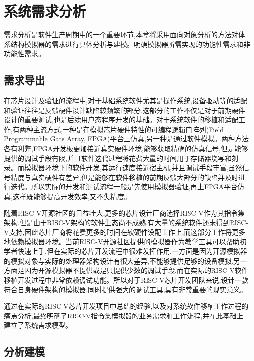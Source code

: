 
\chapter{系统需求分析}

需求分析是软件生产周期中的一个重要环节,本章将采用面向对象分析的方法对体系结构模拟器的需求进行具体分析与建模。明确模拟器所需实现的功能性需求和非功能性需求。

\section{需求导出}

在芯片设计及验证的流程中,对于基础系统软件尤其是操作系统,设备驱动等的适配和验证往往是反馈硬件设计缺陷较频繁的部分,这部分的工作不仅是对于前期硬件设计的重要测试,也是后续用户态程序开发的基础。对于系统软件的移植和适配工作,有两种主流方式,一种是在模拟芯片硬件特性的可编程逻辑门阵列(Field Programmable Gate Array, FPGA)平台上仿真,另一种是通过软件模拟。两种方法各有利弊,FPGA开发板更加接近真实硬件环境,能够获取精确的仿真信号,但是能够提供的调试手段有限,并且软件迭代过程将花费大量的时间用于存储器烧写和刻录。而模拟器环境下的软件开发,其运行速度接近宿主机,并且调试手段丰富,虽然信号精度与真实硬件有差异,但是能够在软件移植的前期反馈大部分的缺陷并及时进行迭代。所以实际的开发和测试流程一般是先使用模拟器验证,再上FPGA平台仿真,这样既能够提高开发效率,又不失精度。


随着RISC-V开源社区的日益壮大,更多的芯片设计厂商选择RISC-V作为其指令集架构,但是由于RISC-V架构的软件生态尚不成熟,有大量的系统软件还未得到RISC-V支持,因此芯片厂商将花费更多的时间在软硬件设配工作上,而这部分工作将更多地依赖模拟器环境。当前RISC-V开源社区提供的模拟器作为教学工具可以帮助初学者快速上手,但在实际的芯片开发流程中很难发挥作用,一方面是因为开源模拟器的模拟对象与实际的处理器架构设计有很大差异,不能够提供足够的设备模拟,另一方面是因为开源模拟器不提供或是只提供少数的调试手段,而在实际的RISC-V软件移植开发过程中非常依赖调试功能。所以对于RISC-V芯片开发团队来说,设计一款符合自身硬件架构的模拟器,同时提供强大的调试工具,具有非常重要的现实意义。


通过在实际的RISC-V芯片开发项目中总结的经验,以及对系统软件移植工作过程的痛点分析,最终明确了RISC-V指令集模拟器的业务需求和工作流程,并在此基础上建立了系统需求模型。


\section{分析建模}

